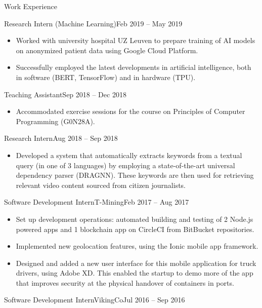 \documentclass[]{mcdowellcv}
\begin{document}
\begin{cvsection}{Work Experience}
\begin{cvsubsection}{Research Intern (Machine Learning)}{}{Feb 2019 -- May 2019}
\begin{itemize}
			\item Worked with university hospital UZ Leuven to prepare training of AI models on anonymized patient data using Google Cloud Platform.
			\item Successfully employed the latest developments in artificial intelligence, both in software (BERT, TensorFlow) and in hardware (TPU).
		\end{itemize}
	\end{cvsubsection}
	\begin{center}
	\end{center}
	\begin{cvsubsection}{Teaching Assistant}{}{Sep 2018 -- Dec 2018}
		\begin{itemize}%
			\item Accommodated exercise sessions for the course on Principles of Computer Programming (G0N28A).
		\end{itemize}
	\end{cvsubsection}
	\begin{cvsubsection}{Research Intern}{}{Aug 2018 -- Sep 2018}
		\begin{itemize}%
			\item Developed a system that automatically extracts keywords from a textual query (in one of 3 languages) by employing a state-of-the-art universal dependency parser (DRAGNN). These keywords are then used for retrieving relevant video content sourced from citizen journalists.
		\end{itemize}
	\end{cvsubsection}
	\begin{cvsubsection}{Software Development Intern}{T-Mining}{Feb 2017 -- Aug 2017}
		\begin{itemize}%
			\item Set up development operations: automated building and testing of 2 Node.js powered apps and 1 blockchain app on CircleCI from BitBucket repositories.
			\item Implemented new geolocation features, using the Ionic mobile app framework. 
			\item Designed and added a new user interface for this mobile application for truck drivers, using Adobe XD. This enabled the startup to demo more of the app that improves security at the physical handover of containers in ports.
		\end{itemize}
	\end{cvsubsection}
	\begin{cvsubsection}{Software Development Intern}{VikingCo}{Jul 2016 -- Sep 2016}

\end{cvsubsection}
\end{cvsection}
\end{document}
